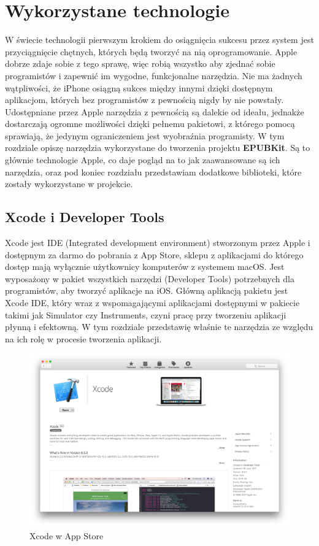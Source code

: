 \chapter{Wykorzystane technologie}

W świecie technologii pierwszym krokiem do osiągnięcia sukcesu przez system jest przyciągnięcie chętnych, których będą tworzyć na nią oprogramowanie. Apple dobrze zdaje sobie z tego sprawę, więc robią wszystko aby zjednać sobie programistów i zapewnić im wygodne, funkcjonalne narzędzia. Nie ma żadnych wątpliwości, że iPhone osiągną sukces między innymi dzięki dostępnym aplikacjom, których bez programistów z pewnością nigdy by nie powstały. Udostępniane przez Apple narzędzia z pewnością są dalekie od ideału, jednakże dostarczają ogromne możliwości dzięki pełnemu pakietowi, z którego pomocą sprawiają, że jedynym ograniczeniem jest wyobraźnia programisty. W tym rozdziale opiszę narzędzia wykorzystane do tworzenia projektu \textbf{EPUBKit}. Są to głównie technologie Apple, co daje pogląd na to jak zaawansowane są ich narzędzia, oraz pod koniec rozdziału przedstawiam dodatkowe biblioteki, które zostały wykorzystane w projekcie.

\section{Xcode i Developer Tools}
Xcode jest IDE (Integrated development environment) stworzonym przez Apple i dostępnym za darmo do pobrania z App Store, sklepu z aplikacjami do którego dostęp mają wyłącznie użytkownicy komputerów z systemem macOS. Jest wyposażony w pakiet wszystkich narzędzi (Developer Tools) potrzebnych dla programistów, aby tworzyć aplikacje na iOS. Główną aplikacją pakietu jest Xcode IDE, który wraz z wspomagającymi aplikacjami dostępnymi w pakiecie takimi jak Simulator czy Instruments, czyni pracę przy tworzeniu aplikacji płynną i efektowną. W tym rozdziale przedstawię właśnie te narzędzia ze względu na ich rolę w procesie tworzenia aplikacji.

\begin{figure}[ht!]
  \centering
  \includegraphics[width=120mm]{images/chapter-2-image-1-appstore.png}
  \caption{Xcode w App Store}
\end{figure}


